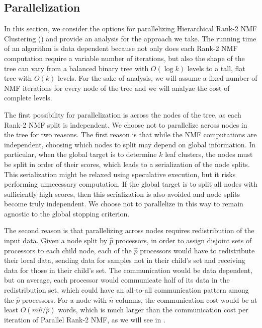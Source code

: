 \documentclass[conference,compsoc]{IEEEtran}
\begin{document}
\subsection{Parallelization}

In this section, we consider the options for parallelizing Hierarchical Rank-2 NMF Clustering () and provide an analysis for the approach we take.
The running time of an algorithm is data dependent because not only does each Rank-2 NMF computation require a variable number of iterations, but also the shape of the tree can vary from a balanced binary tree with $O(\log k)$ levels to a tall, flat tree with $O(k)$ levels.
For the sake of analysis, we will assume a fixed number of NMF iterations for every node of the tree and we will analyze the cost of complete levels.

The first possibility for parallelization is across the nodes of the tree, as each Rank-2 NMF split is independent.
We choose not to parallelize across nodes in the tree for two reasons.
The first reason is that while the NMF computations are independent, choosing which nodes to split may depend on global information.
In particular, when the global target is to determine $k$ leaf clusters, the nodes must be split in order of their scores, which leads to a serialization of the node splits.
This serialization might be relaxed using speculative execution, but it risks performing unnecessary computation.
If the global target is to split all nodes with sufficiently high scores, then this serialization is also avoided and node splits become truly independent.
We choose not to parallelize in this way to remain agnostic to the global stopping criterion.

The second reason is that parallelizing across nodes requires redistribution of the input data.
Given a node split by $\hat p$ processors, in order to assign disjoint sets of processors to each child node, each of the $\hat p$ processors would have to redistribute their local data, sending data for samples not in their child's set and receiving data for those in their child's set.
The communication would be data dependent, but on average, each processor would communicate half of its data in the redistribution set, which could have an all-to-all communication pattern among the $\hat p$ processors.
For a node with $\hat n$ columns, the communication cost would be at least $O(m\hat n/ \hat p)$ words, which is much larger than the communication cost per iteration of Parallel Rank-2 NMF, as we will see in .
\end{document}
